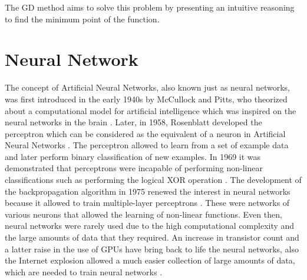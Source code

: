 \documentclass[a4paper, report, oneside, UKenglish]{memoir}
\begin{document}
The GD method aims to solve this problem by presenting an intuitive reasoning to find the minimum point of the function. 














\section{Neural Network}
The concept of Artificial Neural Networks, also known just as neural networks, was first introduced in the early 1940s by McCullock and Pitts, who theorized about a computational model for artificial intelligence which was inspired on the neural networks in the brain \cite{mcculloch_logical_1943}. Later, in 1958, Rosenblatt developed the perceptron which can be considered as the equivalent of a neuron in Artificial Neural Networks \cite{rosenblatt_perceptron_1958}. The perceptron allowed to learn from a set of example data and later perform binary classification of new examples. In 1969 it was demonstrated that perceptrons were incapable of performing non-linear classifications such as performing the logical XOR operation \cite{minsky69perceptrons}. The development of the backpropagation algorithm in 1975 renewed the interest in neural networks because it allowed to train multiple-layer perceptrons \cite{werbos}. These were networks of various neurons that allowed the learning of non-linear functions. Even then, neural networks were rarely used due to the high computational complexity and the large amounts of data that they required. An increase in transistor count and a latter raise in the use of GPUs have bring back to life the neural networks, also the Internet explosion allowed a much easier collection of large amounts of data, which are needed to train neural networks \cite{aggarwal_neural_2018}.
\end{document}
